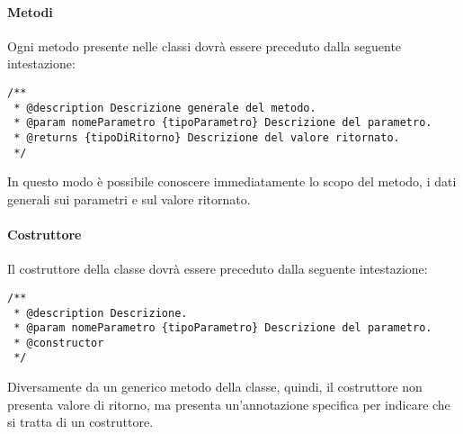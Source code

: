 \paragraph*{Metodi}
Ogni metodo presente nelle classi dovrà essere preceduto dalla seguente intestazione:
\begin{verbatim}
/**
 * @description Descrizione generale del metodo.
 * @param nomeParametro {tipoParametro} Descrizione del parametro.
 * @returns {tipoDiRitorno} Descrizione del valore ritornato.
 */
\end{verbatim}
In questo modo è possibile conoscere immediatamente lo scopo del metodo, i dati generali sui parametri e sul valore ritornato.
\paragraph*{Costruttore}
Il costruttore della classe dovrà essere preceduto dalla seguente intestazione:
\begin{verbatim}
/**
 * @description Descrizione.
 * @param nomeParametro {tipoParametro} Descrizione del parametro.
 * @constructor
 */
\end{verbatim}
Diversamente da un generico metodo della classe, quindi, il costruttore non presenta valore di ritorno, ma presenta un'annotazione specifica per indicare che si tratta di un costruttore.

